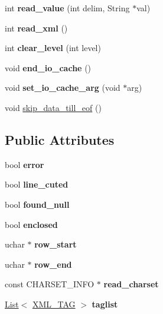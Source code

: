 \begin{DoxyCompactItemize}
int {\bfseries read\+\_\+value} (int delim, String $\ast$val)
\item 
\mbox{\label{classREAD__INFO_a654211402ff7730d56dcbabf29dd3034}} 
int {\bfseries read\+\_\+xml} ()
\item 
\mbox{\label{classREAD__INFO_abdd42388d5df34ab3fd246b01a581ab6}} 
int {\bfseries clear\+\_\+level} (int level)
\item 
\mbox{\label{classREAD__INFO_af71a9de6ac91026ac0b9a2ba7014d835}} 
void {\bfseries end\+\_\+io\+\_\+cache} ()
\item 
\mbox{\label{classREAD__INFO_acf68d086393231e1a45fb5dc1f37a546}} 
void {\bfseries set\+\_\+io\+\_\+cache\+\_\+arg} (void $\ast$arg)
\item 
void \mbox{\hyperlink{classREAD__INFO_a7dad15b4a0abfca25462672a5d0198fa}{skip\+\_\+data\+\_\+till\+\_\+eof}} ()
\end{DoxyCompactItemize}
\subsection*{Public Attributes}
\begin{DoxyCompactItemize}
\item 
\mbox{\label{classREAD__INFO_a9f339013049e3f7ce744ebfdc29f036c}} 
bool {\bfseries error}
\item 
\mbox{\label{classREAD__INFO_a0d654ce6bab320318bfc22b1f01b1969}} 
bool {\bfseries line\+\_\+cuted}
\item 
\mbox{\label{classREAD__INFO_a5a98ff2f9917fe308d4ccb1f5da0ca1f}} 
bool {\bfseries found\+\_\+null}
\item 
\mbox{\label{classREAD__INFO_a44bd809dae54f5fa7904c02e80a252b7}} 
bool {\bfseries enclosed}
\item 
\mbox{\label{classREAD__INFO_a3697942bc33d98a439e5720c224b6962}} 
uchar $\ast$ {\bfseries row\+\_\+start}
\item 
\mbox{\label{classREAD__INFO_ab8e94a7d56dd67753b5cc8a2d0506950}} 
uchar $\ast$ {\bfseries row\+\_\+end}
\item 
\mbox{\label{classREAD__INFO_ad55c12e1a326285ee450f71eb45b3e94}} 
const C\+H\+A\+R\+S\+E\+T\+\_\+\+I\+N\+FO $\ast$ {\bfseries read\+\_\+charset}
\item 
\mbox{\label{classREAD__INFO_a86d8d6cf5a3491a70975507ea1e3353e}} 
\mbox{\hyperlink{classList}{List}}$<$ \mbox{\hyperlink{classXML__TAG}{X\+M\+L\+\_\+\+T\+AG}} $>$ {\bfseries taglist}
\end{DoxyCompactItemize}


